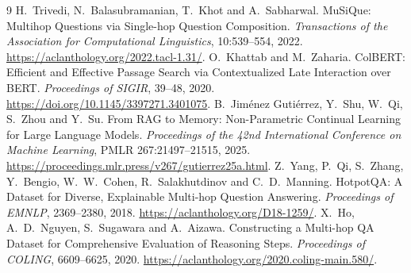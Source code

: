 \documentclass[12pt,a4paper]{report}
\begin{document}
\setcounter{chapter}{3}

\begin{thebibliography}{9}
H.~Trivedi, N.~Balasubramanian, T.~Khot and A.~Sabharwal.
MuSiQue: Multihop Questions via Single-hop Question Composition.
\emph{Transactions of the Association for Computational Linguistics},
10:539--554, 2022.
\url{https://aclanthology.org/2022.tacl-1.31/}.
O.~Khattab and M.~Zaharia.
ColBERT: Efficient and Effective Passage Search via Contextualized Late Interaction over BERT.
\emph{Proceedings of SIGIR}, 39--48, 2020.
\url{https://doi.org/10.1145/3397271.3401075}.
B.~Jim\'enez Guti\'errez, Y.~Shu, W.~Qi, S.~Zhou and Y.~Su.
From RAG to Memory: Non-Parametric Continual Learning for Large Language Models.
\emph{Proceedings of the 42nd International Conference on Machine Learning},
PMLR 267:21497--21515, 2025.
\url{https://proceedings.mlr.press/v267/gutierrez25a.html}.
Z.~Yang, P.~Qi, S.~Zhang, Y.~Bengio, W.~W.~Cohen, R.~Salakhutdinov
and C.~D.~Manning.
HotpotQA: A Dataset for Diverse, Explainable Multi-hop Question Answering.
\emph{Proceedings of EMNLP}, 2369--2380, 2018.
\url{https://aclanthology.org/D18-1259/}.
X.~Ho, A.~D.~Nguyen, S.~Sugawara and A.~Aizawa.
Constructing a Multi-hop QA Dataset for Comprehensive Evaluation of Reasoning Steps.
\emph{Proceedings of COLING}, 6609--6625, 2020.
\url{https://aclanthology.org/2020.coling-main.580/}.
\end{thebibliography}
\end{document}
